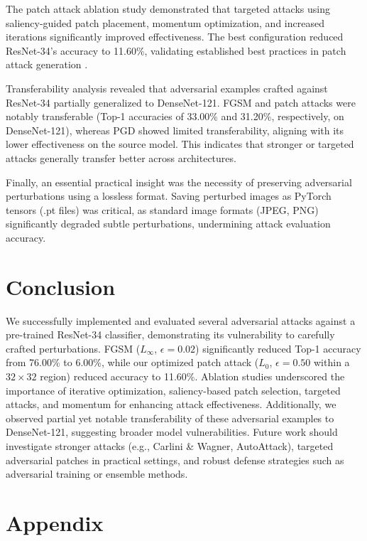 \documentclass[letterpaper]{article}
\begin{document}
The patch attack ablation study demonstrated that targeted attacks using saliency-guided patch placement, momentum optimization, and increased iterations significantly improved effectiveness. The best configuration reduced ResNet-34's accuracy to 11.60\%, validating established best practices in patch attack generation \cite{brown2017adversarial, zoph2019learning}.

Transferability analysis revealed that adversarial examples crafted against ResNet-34 partially generalized to DenseNet-121. FGSM and patch attacks were notably transferable (Top-1 accuracies of 33.00\% and 31.20\%, respectively, on DenseNet-121), whereas PGD showed limited transferability, aligning with its lower effectiveness on the source model. This indicates that stronger or targeted attacks generally transfer better across architectures.

Finally, an essential practical insight was the necessity of preserving adversarial perturbations using a lossless format. Saving perturbed images as PyTorch tensors (.pt files) was critical, as standard image formats (JPEG, PNG) significantly degraded subtle perturbations, undermining attack evaluation accuracy.

\section{Conclusion}
We successfully implemented and evaluated several adversarial attacks against a pre-trained ResNet-34 classifier, demonstrating its vulnerability to carefully crafted perturbations. FGSM ($L_\infty$, $\epsilon=0.02$) significantly reduced Top-1 accuracy from 76.00\% to 6.00\%, while our optimized patch attack ($L_0$, $\epsilon=0.50$ within a $32\times32$ region) reduced accuracy to 11.60\%. Ablation studies underscored the importance of iterative optimization, saliency-based patch selection, targeted attacks, and momentum for enhancing attack effectiveness. Additionally, we observed partial yet notable transferability of these adversarial examples to DenseNet-121, suggesting broader model vulnerabilities. Future work should investigate stronger attacks (e.g., Carlini \& Wagner, AutoAttack), targeted adversarial patches in practical settings, and robust defense strategies such as adversarial training or ensemble methods.


\section*{Appendix}
\label{sec:appendix}
\end{document}
